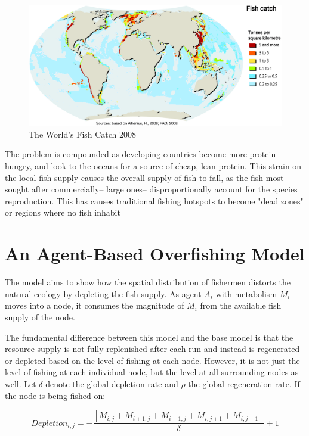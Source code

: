 \documentclass{article}
\begin{document}
\begin{figure}[!ht]
\begin{center}
\includegraphics[scale=.25]{fish.jpg}
\caption{The World's Fish Catch 2008}
\end{center}
\end{figure}

The problem is compounded as developing countries become more protein hungry, and look to the oceans for a source of cheap, lean protein. This strain on the local fish supply causes the overall supply of fish to fall, as the fish most sought after commercially-- large ones-- disproportionally account for the species reproduction. This has causes traditional fishing hotspots to become "dead zones" or regions where no fish inhabit\*

\section{An Agent-Based Overfishing Model}
The model aims to show how the spatial distribution of fishermen distorts the natural ecology by depleting the fish supply. As agent \emph{$A_{i}$} with metabolism \emph{$M_{i}$} moves into a node, it consumes the magnitude of \emph{$M_{i}$} from the available fish supply of the node. \*

The fundamental difference between this model and the base model is that the resource supply is not fully replenished after each run and instead is regenerated or depleted based on the level of fishing at each node. However, it is not just the level of fishing at each individual node, but the level at all surrounding nodes as well. Let $\delta$ denote the global depletion rate and $\rho$ the global regeneration rate. If the node is being fished on:

\begin{equation}
	Depletion_{i,j} = - \frac{[M_{i,j} + M_{i+1, j} + M_{i-1, j} + M_{i, j+1} + M_{i, j-1}]}{\delta} + 1
\end{equation}
\end{document}
